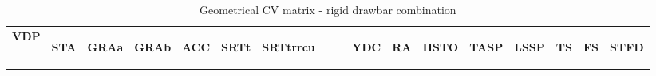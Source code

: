 

\begin{table}[H]
\centering\scriptsize
\caption{Geometrical CV matrix - rigid drawbar combination}   
\label{table:cv-geometrical-rigid-drawbar}%
\begin{tabular}{|l|c|c|c|c|c|c|c|c|c|c|c|c|c|c|}

\hline
\multicolumn{1}{|c|}{\textbf{VDP}} & \begin{sideways}\textbf{STA}\end{sideways} & \begin{sideways}\textbf{GRAa}\end{sideways} & \begin{sideways}\textbf{GRAb}\end{sideways} & \begin{sideways}\textbf{ACC}\end{sideways} & \begin{sideways}\textbf{SRTt}\end{sideways} & \begin{sideways}\textbf{SRTtrrcu~~~~}\end{sideways} & \begin{sideways}\textbf{YDC}\end{sideways} & \begin{sideways}\textbf{RA}\end{sideways} & \begin{sideways}\textbf{HSTO}\end{sideways} & \begin{sideways}\textbf{TASP}\end{sideways} & \begin{sideways}\textbf{LSSP}\end{sideways} & \begin{sideways}\textbf{TS}\end{sideways} & \begin{sideways}\textbf{FS}\end{sideways} & \begin{sideways}\textbf{STFD}\end{sideways} \bigstrut\\


\end{tabular}
\end{table}
